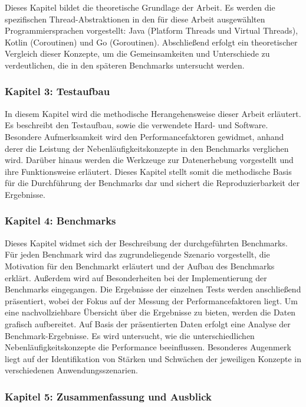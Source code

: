 \documentclass[fontsize=12pt,paper=a4,twoside=semi,parskip=half-,headsepline,headinclude]{scrreprt}
\begin{document}
Dieses Kapitel bildet die theoretische Grundlage der Arbeit. Es werden die spezifischen Thread-Abstraktionen in den für diese Arbeit ausgewählten Programmiersprachen vorgestellt: Java (Platform Threads und Virtual Threads), Kotlin (Coroutinen) und Go (Goroutinen). Abschließend erfolgt ein theoretischer Vergleich dieser Konzepte, um die Gemeinsamkeiten und Unterschiede zu verdeutlichen, die in den späteren Benchmarks untersucht werden.

\subsubsection{Kapitel 3: Testaufbau}

In diesem Kapitel wird die methodische Herangehensweise dieser Arbeit erläutert. Es beschreibt den Testaufbau, sowie die verwendete Hard- und Software. Besondere Aufmerksamkeit wird den Performancefaktoren gewidmet, anhand derer die Leistung der Nebenläufigkeitskonzepte in den Benchmarks verglichen wird. Darüber hinaus werden die Werkzeuge zur Datenerhebung vorgestellt und ihre Funktionsweise erläutert. Dieses Kapitel stellt somit die methodische Basis für die Durchführung der Benchmarks dar und sichert die Reproduzierbarkeit der Ergebnisse.

\subsubsection{Kapitel 4: Benchmarks}

Dieses Kapitel widmet sich der Beschreibung der durchgeführten Benchmarks. Für jeden Benchmark wird das zugrundeliegende Szenario vorgestellt, die Motivation für den Benchmarkt erläutert und der Aufbau des Benchmarks erklärt. Außerdem wird auf Besonderheiten bei der Implementierung der Benchmarks eingegangen. Die Ergebnisse der einzelnen Tests werden anschließend präsentiert, wobei der Fokus auf der Messung der Performancefaktoren liegt. Um eine nachvollziehbare Übersicht über die Ergebnisse zu bieten, werden die Daten grafisch aufbereitet. Auf Basis der präsentierten Daten erfolgt eine Analyse der Benchmark-Ergebnisse. Es wird untersucht, wie die unterschiedlichen Nebenläufigkeitskonzepte die Performance beeinflussen. Besonderes Augenmerk liegt auf der Identifikation von Stärken und Schwächen der jeweiligen Konzepte in verschiedenen Anwendungsszenarien.

\subsubsection{Kapitel 5: Zusammenfassung und Ausblick}
\end{document}
